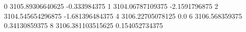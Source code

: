 0 3105.89306640625 -0.333984375
1 3104.06787109375 -2.1591796875
2 3104.545654296875 -1.681396484375
4 3106.22705078125 0.0
6 3106.568359375 0.34130859375
8 3106.381103515625 0.154052734375
